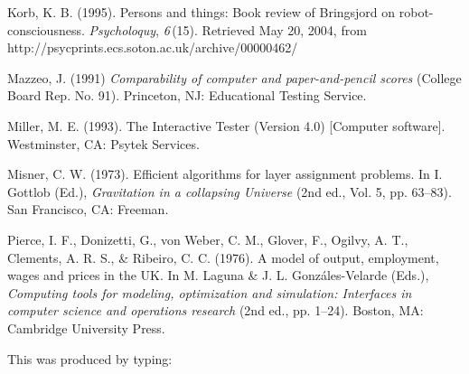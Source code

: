 \documentclass{tATO2e}
\begin{document}
\begin{thebibliography}{12}
Korb, K. B. (1995). Persons and things: Book review of Bringsjord on
 robot-consciousness. {\em Psycholoquy}, {\em{6\,}}(15). Retrieved
 May 20, 2004, from http://psycprints.ecs.soton.ac.uk/archive/00000462/

Mazzeo, J. (1991) {\em{Comparability of computer and paper-and-pencil
 scores}} (College Board Rep. No. 91). Princeton, NJ: Educational
 Testing Service.

Miller, M. E. (1993). The Interactive Tester (Version 4.0) [Computer
 software]. Westminster, CA: Psytek Services.

Misner, C. W. (1973). Efficient algorithms for layer assignment
 problems. In I. Gottlob (Ed.), {\em Gravitation in a collapsing
 Universe} (2nd ed., Vol. 5, pp. 63--83). San Francisco, CA: Freeman.

Pierce, I. F., Donizetti, G., von Weber, C. M., Glover, F., Ogilvy,
 A. T., Clements, A. R. S., \& Ribeiro, C. C. (1976). A model of output,
 employment, wages and prices in the UK. In M. Laguna \& J. L.
 Gonz\'{a}les-Velarde (Eds.), {\em{Computing tools for modeling,
 optimization and simulation: Interfaces in computer science and
 operations research}} (2nd  ed., pp. 1--24). Boston, MA: Cambridge
 University Press.

\end{thebibliography}

\bigskip
\noindent This was produced by typing:
\end{document}
